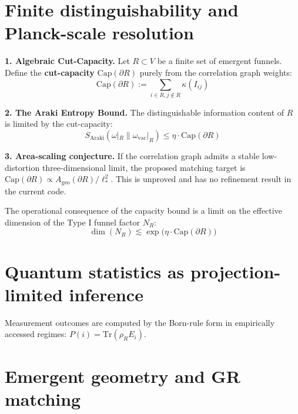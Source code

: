\documentclass[reprint, amsmath, amssymb, aps, prd]{revtex4-2}
\begin{document}
\section{Finite distinguishability and Planck-scale resolution}
\textbf{1. Algebraic Cut-Capacity.} Let $R \subset V$ be a finite set of emergent funnels. Define the \textbf{cut-capacity} $\mathrm{Cap}(\partial R)$ purely from the correlation graph weights:
\begin{equation}
\mathrm{Cap}(\partial R) := \sum_{i\in R, j\notin R} \kappa(I_{ij})
\end{equation}

\textbf{2. The Araki Entropy Bound.} The distinguishable information content of $R$ is limited by the cut-capacity:
\begin{equation}
S_{\text{Araki}}( \omega|_R \| \omega_{\text{vac}}|_R ) \leq \eta \cdot \mathrm{Cap}(\partial R)
\end{equation}

\textbf{3. Area-scaling conjecture.} If the correlation graph admits a stable low-distortion three-dimensional limit, the proposed matching target is $\mathrm{Cap}(\partial R) \propto A_{\text{geo}}(\partial R) / \ell_*^2$. This is unproved and has no refinement result in the current code.

The operational consequence of the capacity bound is a limit on the effective dimension of the Type I funnel factor $N_R$:
\begin{equation}
\dim(N_R) \lesssim \exp\big( \eta \cdot \mathrm{Cap}(\partial R) \big)
\end{equation}

\section{Quantum statistics as projection-limited inference}
Measurement outcomes are computed by the Born-rule form in empirically accessed regimes: $P(i) = \text{Tr}(\rho_R E_i)$.
\section{Emergent geometry and GR matching}
\end{document}
